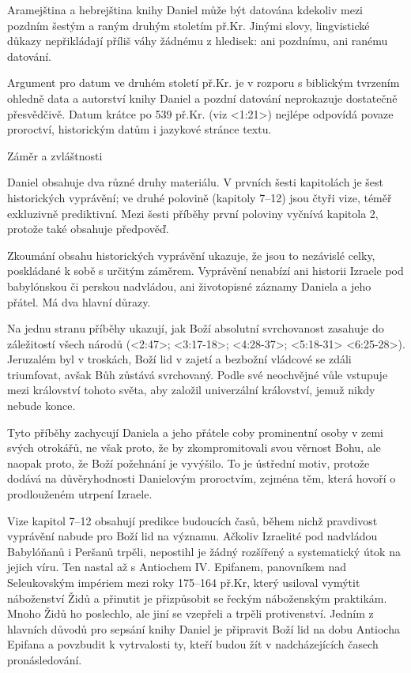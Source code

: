 Aramejština a hebrejština knihy Daniel může být datována kdekoliv mezi pozdním šestým a raným druhým stoletím př.Kr. Jinými slovy, lingvistické důkazy nepřikládají příliš váhy žádnému z hledisek: ani pozdnímu, ani ranému datování.

Argument pro datum ve druhém století př.Kr. je v rozporu s biblickým tvrzením ohledně data a autorství knihy Daniel a pozdní datování neprokazuje dostatečně přesvědčivě.   Datum krátce po 539 př.Kr. (viz <1:21>) nejlépe odpovídá povaze proroctví, historickým datům i jazykové stránce textu.


 Záměr a zvláštnosti
 
 Daniel obsahuje dva různé druhy materiálu.
 V prvních šesti kapitolách je šest historických vyprávění; ve druhé polovině (kapitoly 7--12) jsou čtyři vize, téměř exkluzivně prediktivní. Mezi šesti příběhy první poloviny vyčnívá kapitola 2, protože také obsahuje předpověď. 

Zkoumání obsahu historických vyprávění ukazuje, že jsou to nezávislé celky, poskládané k sobě s určitým záměrem.
Vyprávění nenabízí ani historii Izraele pod babylónskou či perskou nadvládou, ani životopisné záznamy Daniela a jeho přátel. Má dva hlavní důrazy.

Na jednu stranu příběhy ukazují, jak Boží absolutní svrchovanost zasahuje do záležitostí všech národů 
(<2:47>; <3:17-18>; <4:28-37>; <5:18-31> <6:25-28>).
Jeruzalém byl v troskách, Boží lid v zajetí a bezbožní vládcové se zdáli triumfovat, avšak Bůh zůstává svrchovaný.
Podle své neochvějné vůle vstupuje mezi království tohoto světa, aby založil univerzální království, jemuž nikdy nebude konce.

Tyto příběhy zachycují Daniela a jeho přátele coby prominentní osoby v zemi svých otrokářů, ne však proto, že by zkompromitovali svou věrnost Bohu, ale naopak proto, že Boží požehnání je vyvýšilo.
To je ústřední motiv, protože dodává na důvěryhodnosti Danielovým proroctvím, zejména těm, která hovoří o prodlouženém utrpení Izraele. 

Vize kapitol 7--12 obsahují predikce budoucích časů, během nichž pravdivost vyprávění nabude pro Boží lid na významu.
Ačkoliv Izraelité pod nadvládou Babylóňanů i Peršanů trpěli, nepostihl je žádný rozšířený a systematický útok na jejich víru. Ten nastal až s Antiochem IV. Epifanem, panovníkem nad Seleukovským impériem mezi roky 175--164 př.Kr, který
usiloval vymýtit náboženství Židů a přinutit je přizpůsobit se řeckým náboženským praktikám.
Mnoho Židů ho poslechlo, ale jiní se vzepřeli a trpěli protivenství. 
Jedním z hlavních důvodů pro sepsání knihy Daniel je připravit Boží lid na dobu Antiocha Epifana a povzbudit k vytrvalosti ty, kteří budou žít v nadcházejících časech pronásledování.

